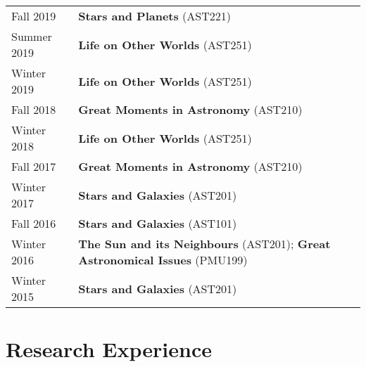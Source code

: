\documentclass[10pt]{res} %
\begin{document}
\begin{resume}
\begin{table}[h!]
\begin{tabularx}{\textwidth}{ @{} p{6.5em} X @{} }
Fall 2019         & \textbf{Stars and Planets} (AST221) \\
Summer 2019 & \textbf{Life on Other Worlds} (AST251) \\
Winter 2019    & \textbf{Life on Other Worlds} (AST251) \\
Fall 2018         & \textbf{Great Moments in Astronomy} (AST210) \\
Winter 2018    & \textbf{Life on Other Worlds} (AST251) \\
Fall 2017         & \textbf{Great Moments in Astronomy} (AST210) \\
Winter 2017    & \textbf{Stars and Galaxies} (AST201) \\
Fall 2016         & \textbf{Stars and Galaxies} (AST101) \\
Winter 2016    & \textbf{The Sun and its Neighbours} (AST201); \textbf{Great Astronomical Issues} (PMU199) \\
Winter 2015    & \textbf{Stars and Galaxies} (AST201)
\end{tabularx}
\end{table}


\section{\Large Research Experience}
\vspace{-5pt} %
\noindent\makebox[\linewidth]{\rule{\textwidth}{0.4pt}}
\vspace{-20pt} %


\end{resume}
\end{document}
